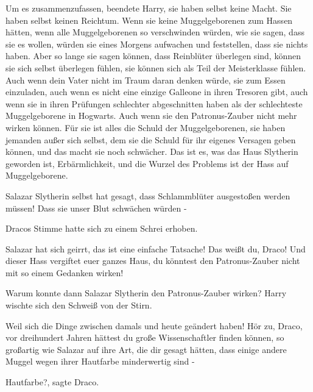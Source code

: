 \glqq{}Um es zusammenzufassen\grqq{}, beendete Harry, \glqq{}sie haben selbst
keine Macht. Sie haben selbst keinen Reichtum. Wenn sie keine Muggelgeborenen
zum Hassen hätten, wenn alle Muggelgeborenen so verschwinden würden, wie sie
sagen, dass sie es wollen, würden sie eines Morgens aufwachen und feststellen,
dass sie nichts haben. Aber so lange sie sagen können, dass Reinblüter überlegen
sind, können sie sich selbst überlegen fühlen, sie können sich als Teil der
Meisterklasse fühlen. Auch wenn dein Vater nicht im Traum daran denken würde,
sie zum Essen einzuladen, auch wenn es nicht eine einzige Galleone in ihren
Tresoren gibt, auch wenn sie in ihren Prüfungen schlechter abgeschnitten haben
als der schlechteste Muggelgeborene in Hogwarts. Auch wenn sie den
Patronus-Zauber nicht mehr wirken können. Für sie ist alles die Schuld der
Muggelgeborenen, sie haben jemanden außer sich selbst, dem sie die Schuld für
ihr eigenes Versagen geben können, und das macht sie noch schwächer. Das ist es,
was das Haus Slytherin geworden ist, Erbärmlichkeit, und die Wurzel des Problems
ist der Hass auf Muggelgeborene.\grqq{}

\glqq{}Salazar Slytherin selbst hat gesagt, dass Schlammblüter ausgestoßen werden
müssen! Dass sie unser Blut schwächen würden -\grqq{}

Dracos Stimme hatte sich zu einem Schrei erhoben.

\glqq{}Salazar hat sich geirrt, das ist eine einfache Tatsache! Das weißt du,
Draco! Und dieser Hass vergiftet euer ganzes Haus, du könntest den
Patronus-Zauber nicht mit so einem Gedanken wirken!\grqq{}

\glqq{}Warum konnte dann Salazar Slytherin den Patronus-Zauber wirken?\grqq{}
Harry wischte sich den Schweiß von der Stirn.

\glqq{}Weil sich die Dinge zwischen damals und heute geändert haben! Hör zu,
Draco, vor dreihundert Jahren hättest du große Wissenschaftler finden können, so
großartig wie Salazar auf ihre Art, die dir gesagt hätten, dass einige andere
Muggel wegen ihrer Hautfarbe minderwertig sind -\grqq{}

\glqq{}Hautfarbe?\grqq{}, sagte Draco.

